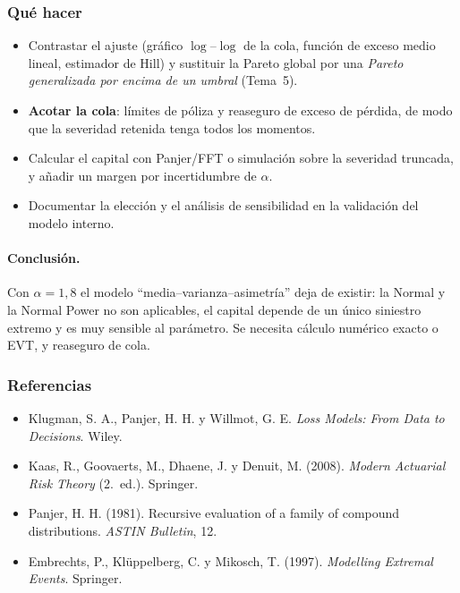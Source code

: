 \documentclass[a4paper,12pt]{article}
\begin{document}
\subsubsection*{Qu\'e hacer}
\begin{itemize}[leftmargin=*,itemsep=1pt]
\item Contrastar el ajuste (gr\'afico $\log$--$\log$ de la cola, funci\'on de exceso medio lineal, estimador de Hill) y sustituir la Pareto global por una \emph{Pareto generalizada por encima de un umbral} (Tema~5).
\item \textbf{Acotar la cola}: l\'imites de p\'oliza y reaseguro de exceso de p\'erdida, de modo que la severidad retenida tenga todos los momentos.
\item Calcular el capital con Panjer/FFT o simulaci\'on sobre la severidad truncada, y a\~nadir un margen por incertidumbre de $\alpha$.
\item Documentar la elecci\'on y el an\'alisis de sensibilidad en la validaci\'on del modelo interno.
\end{itemize}

\paragraph{Conclusi\'on.} Con $\alpha=1{,}8$ el modelo ``media--varianza--asimetr\'ia'' deja de existir: la Normal y la Normal Power no son aplicables, el capital depende de un \'unico siniestro extremo y es muy sensible al par\'ametro. Se necesita c\'alculo num\'erico exacto o EVT, y reaseguro de cola.

\subsubsection*{Referencias}
\begin{itemize}[leftmargin=*,itemsep=0pt]
\item Klugman, S. A., Panjer, H. H. y Willmot, G. E. \emph{Loss Models: From Data to Decisions}. Wiley.
\item Kaas, R., Goovaerts, M., Dhaene, J. y Denuit, M. (2008). \emph{Modern Actuarial Risk Theory} (2.\textordfeminine\ ed.). Springer.
\item Panjer, H. H. (1981). Recursive evaluation of a family of compound distributions. \emph{ASTIN Bulletin}, 12.
\item Embrechts, P., Kl\"uppelberg, C. y Mikosch, T. (1997). \emph{Modelling Extremal Events}. Springer.
\end{itemize}
\end{document}

